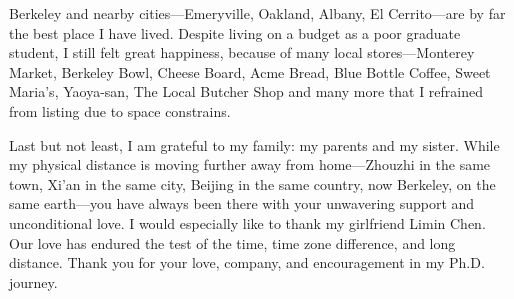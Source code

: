 \documentclass[thesis.tex]{subfiles}
\begin{document}
\begin{acknowledgements}
  Berkeley and nearby cities---Emeryville, Oakland, Albany, El Cerrito---are by
  far the best place I have lived. Despite living on a budget as a poor graduate
  student, I still felt great happiness, because of many local stores---Monterey
  Market, Berkeley Bowl, Cheese Board, Acme Bread, Blue Bottle Coffee, Sweet
  Maria's, Yaoya-san, The Local Butcher Shop and many more that I refrained from
  listing due to space constrains.

  Last but not least, I am grateful to my family: my parents and my
  sister. While my physical distance is moving further away from home---Zhouzhi
  in the same town, Xi'an in the same city, Beijing in the same country, now
  Berkeley, on the same earth---you have always been there with your unwavering
  support and unconditional love. I would especially like to thank my girlfriend
  Limin Chen. Our love has endured the test of the time, time zone difference,
  and long distance. Thank you for your love, company, and encouragement in my
  Ph.D. journey.

\end{acknowledgements}
\end{document}
